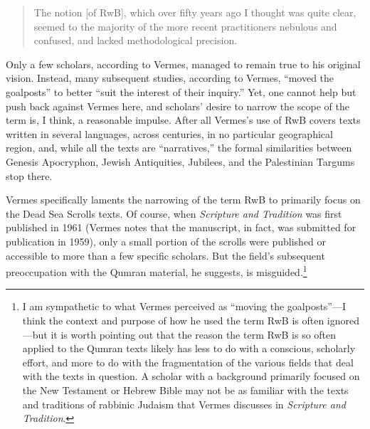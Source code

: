 \begin{quote}
The notion {[}of RwB{]}, which over fifty years ago I thought was quite
clear, seemed to the majority of the more recent practitioners nebulous
and confused, and lacked methodological
precision.\autocite[3]{vermes_zsengeller2014}
\end{quote}

Only a few scholars, according to Vermes, managed to remain true to his
original vision.\autocites[He specifically
references][]{alexander_carson-williamson1988}[and][]{bernstein_textus2005}
Instead, many subsequent studies, according to Vermes, ``moved the
goalposts'' to better ``suit the interest of their
inquiry.''\autocite[4]{vermes_zsengeller2014} Yet, one cannot help but
push back against Vermes here, and scholars' desire to narrow the scope
of the term is, I think, a reasonable impulse. After all Vermes's use of
RwB covers texts written in several languages, across centuries, in no
particular geographical region, and, while all the texts are
``narratives,'' the formal similarities between Genesis Apocryphon,
Jewish Antiquities, Jubilees, and the Palestinian Targums stop there.

Vermes specifically laments the narrowing of the term RwB to primarily
focus on the Dead Sea Scrolls texts. Of course, when
\emph{Scripture and Tradition} was first published in 1961 (Vermes notes
that the manuscript, in fact, was submitted for publication in 1959),
only a small portion of the scrolls were published or accessible to more
than a few specific scholars. But the field's subsequent preoccupation
with the Qumran material, he suggests, is misguided.\footnote{I am
  sympathetic to what Vermes perceived as ``moving the goalposts''---I
  think the context and purpose of how he used the term RwB is often
  ignored---but it is worth pointing out that the reason the term RwB is
  so often applied to the Qumran texts likely has less to do with a
  conscious, scholarly effort, and more to do with the fragmentation of
  the various fields that deal with the texts in question. A scholar
  with a background primarily focused on the New Testament or Hebrew
  Bible may not be as familiar with the texts and traditions of rabbinic
  Judaism that Vermes discusses in \emph{Scripture and Tradition}.}

